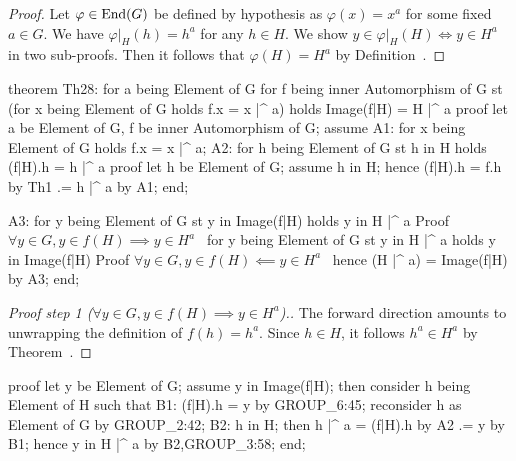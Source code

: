 \begin{proof}
Let $\varphi\in\operatorname{End}(G)$ be defined by hypothesis as $\varphi(x)=x^{a}$
for some fixed $a\in G$. We have $\varphi|_{H}(h)= h^{a}$ for any $h\in H$.
We show $y\in\varphi|_{H}(H)\iff y\in H^{a}$ in two sub-proofs. Then it
follows that $\varphi(H)=H^{a}$ by Definition~.
\end{proof}

\nwenddocs{}\endmoddef\nwstartdeflinemarkup{}\nwenddeflinemarkup
theorem Th28:
  for a being Element of G
  for f being inner Automorphism of G
  st (for x being Element of G holds f.x = x |^ a)
  holds Image(f|H) = H |^ a
proof
  let a be Element of G,
      f be inner Automorphism of G;
  assume
A1: for x being Element of G holds f.x = x |^ a;
A2: for h being Element of G st h in H holds (f|H).h = h |^ a
  proof
    let h be Element of G;
    assume h in H;
    hence (f|H).h = f.h by Th1
                 .= h |^ a by A1;
  end;

A3: for y being Element of G st y in Image(f|H) holds y in H |^ a
  \LA{}Proof $\forall y\in G, y\in f(H)\implies y\in H^{a}$~{\nwtagstyle{}}\RA{}
  for y being Element of G st y in H |^ a holds y in Image(f|H)
  \LA{}Proof $\forall y\in G, y \in f(H)\impliedby y\in H^{a}$~{\nwtagstyle{}}\RA{}
  hence (H |^ a) = Image(f|H) by A3;
end;
\eatline
{}\nwendcode{}\nwdocspar
\begin{proof}[{Proof step 1 ($\forall y\in G, y\in f(H)\implies y\in H^{a}$)}.]
The forward direction amounts to unwrapping the definition of $f(h) = h^{a}$.
Since $h\in H$, it follows $h^{a}\in H^{a}$ by Theorem~.
\end{proof}

\nwenddocs{}\endmoddef\nwstartdeflinemarkup{}\nwenddeflinemarkup
proof
  let y be Element of G;
  assume y in Image(f|H);
  then consider h being Element of H such that
  B1: (f|H).h = y by GROUP_6:45;
  reconsider h as Element of G by GROUP_2:42;
  B2: h in H;
  then h |^ a = (f|H).h by A2
             .= y by B1;
  hence y in H |^ a by B2,GROUP_3:58;
end;
\nwendcode{}\nwdocspar

